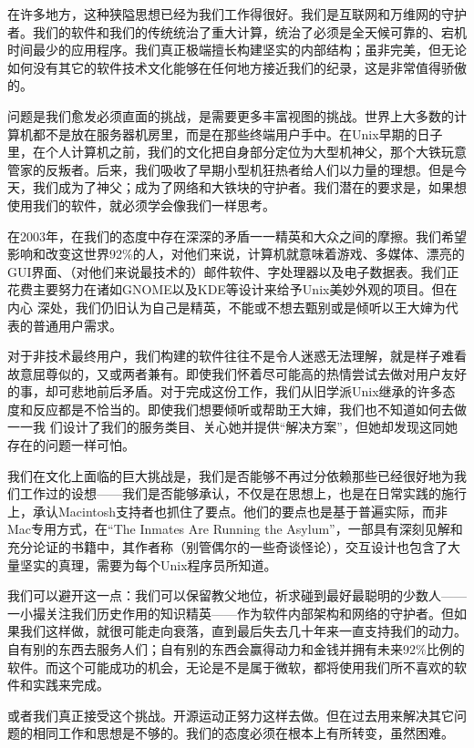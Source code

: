 \documentclass[12pt,oneside]{book}
\begin{document}
在许多地方，这种狭隘思想已经为我们工作得很好。我们是互联网和万维网的守护者。我们的软件和我们的传统统治了重大计算，统治了必须是全天候可靠的、宕机时间最少的应用程序。我们真正极端擅长构建坚实的内部结构；虽非完美，但无论如何没有其它的软件技术文化能够在任何地方接近我们的纪录，这是非常值得骄傲的。

问题是我们愈发必须直面的挑战，是需要更多丰富视图的挑战。世界上大多数的计算机都不是放在服务器机房里，而是在那些终端用户手中。在Unix早期的日子里，在个人计算机之前，我们的文化把自身部分定位为大型机神父，那个大铁玩意管家的反叛者。后来，我们吸收了早期小型机狂热者给人们以力量的理想。但是今天，我们成为了神父；成为了网络和大铁块的守护者。我们潜在的要求是，如果想使用我们的软件，就必须学会像我们一样思考。

在2003年，在我们的态度中存在深深的矛盾一一精英和大众之间的摩擦。我们希望影响和改变这世界92\%{}的人，对他们来说，计算机就意味着游戏、多媒体、漂亮的GUI界面、（对他们来说最技术的）邮件软件、字处理器以及电子数据表。我们正花费主要努力在诸如GNOME以及KDE等设计来给予Unix美妙外观的项目。但在内心
深处，我们仍旧认为自己是精英，不能或不想去甄别或是倾听以王大婶为代表的普通用户需求。

对于非技术最终用户，我们构建的软件往往不是令人迷惑无法理解，就是样子难看故意屈尊似的，又或两者兼有。即使我们怀着尽可能高的热情尝试去做对用户友好的事，却可悲地前后矛盾。对于完成这份工作，我们从旧学派Unix继承的许多态度和反应都是不恰当的。即使我们想要倾听或帮助王大婶，我们也不知道如何去做一一我
们设计了我们的服务类目、关心她并提供“解决方案”，但她却发现这同她存在的问题一样可怕。

我们在文化上面临的巨大挑战是，我们是否能够不再过分依赖那些已经很好地为我们工作过的设想——我们是否能够承认，不仅是在思想上，也是在日常实践的施行上，承认Macintosh支持者也抓住了要点。他们的要点也是基于普遍实际，而非Mac专用方式，在“The Inmates Are Running the Asylum\cite{Cooper}”，一部具有深刻见解和充分论证的书籍中，其作者称（别管偶尔的一些奇谈怪论），交互设计也包含了大量坚实的真理，需要为每个Unix程序员所知道。

我们可以避开这一点：我们可以保留教父地位，祈求碰到最好最聪明的少数人——一小撮关注我们历史作用的知识精英——作为软件内部架构和网络的守护者。但如果我们这样做，就很可能走向衰落，直到最后失去几十年来一直支持我们的动力。自有别的东西去服务人们；自有别的东西会赢得动力和金钱并拥有未来92\%{}比例的软件。而这个可能成功的机会，无论是不是属于微软，都将使用我们所不喜欢的软件和实践来完成。

或者我们真正接受这个挑战。开源运动正努力这样去做。但在过去用来解决其它问题的相同工作和思想是不够的。我们的态度必须在根本上有所转变，虽然困难。
\end{document}
